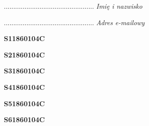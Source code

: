 \begin{turn}{90}\begin{minipage}{\linewidth} \vspace{20mm} ................................................  \textit{Imię i nazwisko}\end{minipage}\end{turn}

\begin{turn}{90}\begin{minipage}{\linewidth} \vspace{20mm} ................................................  \textit{Adres e-mailowy}\end{minipage}\end{turn}

\begin{turn}{90}\huge \begin{minipage}{\linewidth} \vspace{10mm}\textbf{S11860104C}\end{minipage}\end{turn}

\begin{turn}{90}\huge \begin{minipage}{\linewidth} \vspace{10mm}\textbf{S21860104C}\end{minipage}\end{turn}

\begin{turn}{90}\huge \begin{minipage}{\linewidth} \vspace{10mm}\textbf{S31860104C}\end{minipage}\end{turn}

\begin{turn}{90}\huge \begin{minipage}{\linewidth} \vspace{10mm}\textbf{S41860104C}\end{minipage}\end{turn}

\begin{turn}{90}\huge \begin{minipage}{\linewidth} \vspace{10mm}\textbf{S51860104C}\end{minipage}\end{turn}

\begin{turn}{90}\huge \begin{minipage}{\linewidth} \vspace{10mm}\textbf{S61860104C}\end{minipage}\end{turn}

